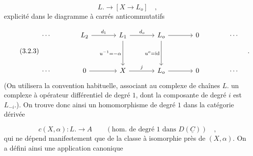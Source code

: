 \begin{equation}\tag{3.2.2}
L. \longrightarrow [X \longrightarrow L_o] \quad ,
\end{equation}
explicité dans le diagramme à carrés anticommutatifs

\begin{equation}\tag{3.2.3}
\begin{tikzcd}[column sep=large, row sep=huge]
\cdots & L_2 \arrow[r, "d_1"] & L_1 \arrow[r, "d_o"] \arrow[d, "u^{-1} = -\alpha"'] & L_o \arrow[r] \arrow[d, "u^o = \mathrm{id}"'] & 0 & \cdots \\
\cdots & 0 \arrow[r] & X \arrow[r, "j"] & L_o \arrow[r] & 0 & \cdots
\end{tikzcd}\quad .
\end{equation}
(On utilisera la convention habituelle, associant au complexe de chaînes $L.$ un complexe à opérateur différentiel de degré $1$, dont la composante de degré $i$ est $L_{-i}$.). On trouve donc ainsi un homomorphisme de degré $1$ dans la catégorie dérivée

\begin{equation}\tag{3.2.3}
c(X,\alpha) : L. \longrightarrow A \qquad (\text{hom. de degré 1 dans } D(\underline{C})) \quad ,
\end{equation}
qui ne dépend manifestement que de la classe à isomorphie près de $(X,\alpha)$. On a défini ainsi une application canonique

